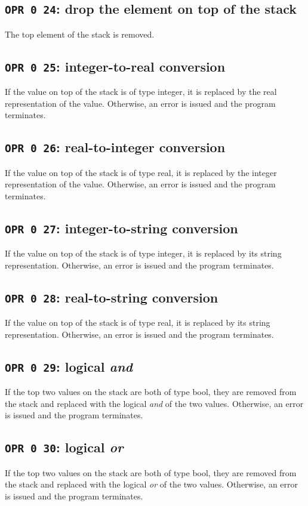 \documentclass[a4paper,10pt]{report}
\begin{document}
\subsection{\texttt{OPR 0 24}: drop the element on top of the stack}
The top element of the stack is removed.

\subsection{\texttt{OPR 0 25}: integer-to-real conversion}
If the value on top of the stack is of type integer, it is replaced by
the real representation of the value.  Otherwise, an error is issued
and the program terminates.

\subsection{\texttt{OPR 0 26}: real-to-integer conversion}
If the value on top of the stack is of type real, it is replaced by
the integer representation of the value.  Otherwise, an error is
issued and the program terminates.

\subsection{\texttt{OPR 0 27}: integer-to-string conversion}
If the value on top of the stack is of type integer, it is replaced by
its string representation.  Otherwise, an error is issued and the
program terminates.

\subsection{\texttt{OPR 0 28}: real-to-string conversion}
If the value on top of the stack is of type real, it is replaced by
its string representation.  Otherwise, an error is issued and the
program terminates.

\subsection{\texttt{OPR 0 29}: logical \emph{and}}
If the top two values on the stack are both of type bool, they are
removed from the stack and replaced with the logical \emph{and} of the
two values.  Otherwise, an error is issued and the program terminates.

\subsection{\texttt{OPR 0 30}: logical \emph{or}}
If the top two values on the stack are both of type bool, they are
removed from the stack and replaced with the logical \emph{or} of the
two values.  Otherwise, an error is issued and the program terminates.
\end{document}
